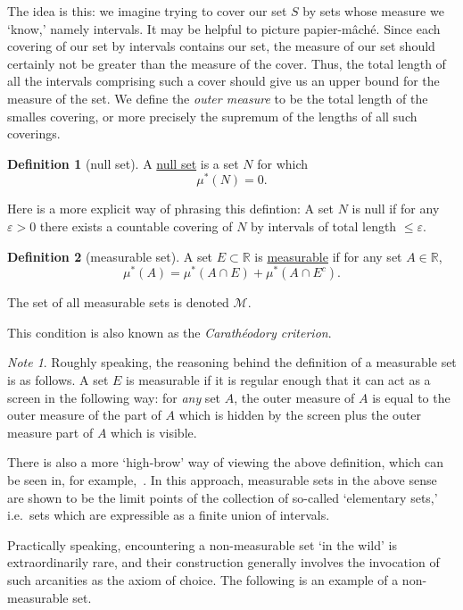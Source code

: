 \documentclass[a4paper,12pt]{scrreprt}
\newcommand{\R}{\mathbb{R}}
\newcommand{\defn}[1]{\ul{#1}}
\theoremstyle{definition}
\newtheorem{definition}{Definition}[section]
\theoremstyle{plain}
\theoremstyle{remark}
\newtheorem{note}{Note}[section]
\begin{document}
The idea is this: we imagine trying to cover our set $S$ by sets whose measure we `know,' namely intervals. It may be helpful to picture papier-m\^{a}ch\'{e}. Since each covering of our set by intervals contains our set, the measure of our set should certainly not be greater than the measure of the cover. Thus, the total length of all the intervals comprising such a cover should give us an upper bound for the measure of the set. We define the \emph{outer measure} to be the total length of the smalles covering, or more precisely the supremum of the lengths of all such coverings.

\begin{definition}[null set]
  \label{def:nullset}
  A \defn{null set} is a set $N$ for which
  \begin{equation*}
    \mu^{*}(N) = 0.
  \end{equation*}

  Here is a more explicit way of phrasing this defintion: A set $N$ is null if for any $\varepsilon > 0$ there exists a countable covering of $N$ by intervals of total length $\leq \varepsilon$.
\end{definition}

\begin{definition}[measurable set]
  \label{def:measurableset}
  A set $E \subset \R$ is \defn{measurable} if for any set $A \in \R$,
  \begin{equation*}
    \mu^{*}(A) = \mu^{*}(A \cap E) + \mu^{*} (A \cap E^{c}).
  \end{equation*}

  The set of all measurable sets is denoted $\mathcal{M}$.

  This condition is also known as the \emph{Carath\'{e}odory criterion}.
\end{definition}

\begin{note}
  Roughly speaking, the reasoning behind the definition of a measurable set is as follows. A set $E$ is measurable if it is regular enough that it can act as a screen in the following way: for \emph{any} set $A$, the outer measure of $A$ is equal to the outer measure of the part of $A$ which is hidden by the screen plus the outer measure part of $A$ which is visible.

  There is also a more `high-brow' way of viewing the above definition, which can be seen in, for example,~\cite{measurablesetsarelimitpoints}. In this approach, measurable sets in the above sense are shown to be the limit points of the collection of so-called `elementary sets,' i.e.\ sets which are expressible as a finite union of intervals.

  Practically speaking, encountering a non-measurable set `in the wild' is extraordinarily rare, and their construction generally involves the invocation of such arcanities as the axiom of choice. The following is an example of a non-measurable set.
\end{note}
\end{document}
